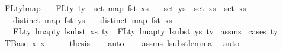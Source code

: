 \begin{isabellebody}
\endisatagproof
{\isafoldproof}%
%
\isadelimproof
\isanewline
%
\endisadelimproof
\isanewline
\isanewline
\isanewline
\isanewline
{}\isamarkupfalse%
\ FL{\isacharunderscore}{\kern0pt}ty{\isacharunderscore}{\kern0pt}lmap{}{\isacharcolon}{\kern0pt}\isanewline
\ \ \ {\isachardoublequoteopen}FLty\ ty\ {\isacharequal}{\kern0pt}\ set\ {\isacharparenleft}{\kern0pt}map\ fst\ xs{}{\isacharparenright}{\kern0pt}{\isachardoublequoteclose}\isanewline
\ \ \ {\isachardoublequoteopen}set\ ys\ {\isacharequal}{\kern0pt}\ set\ xs{}\ {\isasymunion}\ set\ xs{}{\isachardoublequoteclose}\isanewline
\ \ \ {\isachardoublequoteopen}distinct\ {\isacharparenleft}{\kern0pt}map\ fst\ ys{\isacharparenright}{\kern0pt}{\isachardoublequoteclose}\isanewline
\ \ \ {\isachardoublequoteopen}distinct\ {\isacharparenleft}{\kern0pt}map\ fst\ xs{}{\isacharparenright}{\kern0pt}{\isachardoublequoteclose}\isanewline
\ \ \ {\isachardoublequoteopen}FLty\ {\isacharparenleft}{\kern0pt}lmap{\isacharunderscore}{\kern0pt}ty\ {\isacharparenleft}{\kern0pt}lsubst\ xs{}{\isacharparenright}{\kern0pt}\ ty{\isacharparenright}{\kern0pt}\ {\isacharequal}{\kern0pt}\ FLty\ {\isacharparenleft}{\kern0pt}lmap{\isacharunderscore}{\kern0pt}ty\ {\isacharparenleft}{\kern0pt}lsubst\ ys{\isacharparenright}{\kern0pt}\ ty{\isacharparenright}{\kern0pt}{\isachardoublequoteclose}\isanewline
%
\isadelimproof
%
\endisadelimproof
%
\isatagproof
{}\isamarkupfalse%
\ assms\isanewline
{}\isamarkupfalse%
\ {\isacharparenleft}{\kern0pt}cases\ ty{\isacharparenright}{\kern0pt}\isanewline
\ \ \isamarkupfalse%
\ {\isacharparenleft}{\kern0pt}TBase\ x{}{}\ x{}{}{\isacharparenright}{\kern0pt}\isanewline
\ \ \isamarkupfalse%
\ \isamarkupfalse%
\ {\isacharquery}{\kern0pt}thesis\isanewline
\ \ \isamarkupfalse%
\ auto\isanewline
\ \ \isamarkupfalse%
\ assms{\isacharparenleft}{\kern0pt}{}{\isacharcomma}{\kern0pt}{}{\isacharcomma}{\kern0pt}{}{\isacharcomma}{\kern0pt}{}{\isacharparenright}{\kern0pt}\ lsubst{\isacharunderscore}{\kern0pt}lemma{}\ \isamarkupfalse%
\ auto{\isacharbrackleft}{\kern0pt}{}{\isacharbrackright}{\kern0pt}\isanewline
\ \ \isamarkupfalse%

\end{isabellebody}
